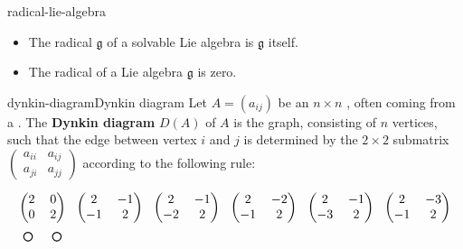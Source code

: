 \begin{example}{radical-lie-algebra}
    \begin{itemize}
        \item The radical $\mathfrak{g}$ of a solvable Lie algebra is $\mathfrak{g}$ itself.
        \item The radical of a  Lie algebra $\mathfrak{g}$ is zero.
    \end{itemize}
\end{example}

\begin{topic}{dynkin-diagram}{Dynkin diagram}
    Let $A = (a_{ij})$ be an $n \times n$ , often coming from a . The \textbf{Dynkin diagram} $D(A)$ of $A$ is the graph, consisting of $n$ vertices, such that the edge between vertex $i$ and $j$ is determined by the $2 \times 2$ submatrix $\begin{pmatrix} a_{ii} & a_{ij} \\ a_{ji} & a_{jj} \end{pmatrix}$ according to the following rule:
    \[ \setlength{\arraycolsep}{3pt} \begin{tikzcd}[column sep=0em, row sep=0em]
        \begin{pmatrix} 2 & 0 \\ 0 & 2 \end{pmatrix} & \begin{pmatrix} 2 & -1 \\ -1 & 2 \end{pmatrix} & \begin{pmatrix} 2 & -1 \\ -2 & 2 \end{pmatrix} & \begin{pmatrix} 2 & -2 \\ -1 & 2 \end{pmatrix} & \begin{pmatrix} 2 & -1 \\ -3 & 2 \end{pmatrix} & \begin{pmatrix} 2 & -3 \\ -1 & 2 \end{pmatrix} \\
            \begin{tikzpicture}[scale=.4]
                \draw[thick] (0cm,0) circle (.3cm);
                \draw[thick] (2cm,0) circle (.3cm);
            \end{tikzpicture} & \begin{tikzpicture}[scale=.4]

\end{tikzpicture}
\end{tikzcd}\]
\end{topic}
